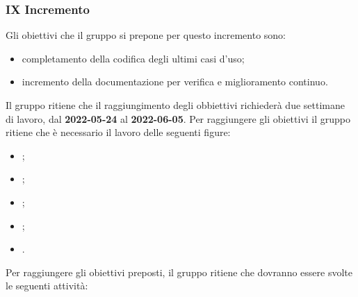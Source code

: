 \subsubsection{IX Incremento}
Gli obiettivi che il gruppo si prepone per questo incremento sono:
\begin{itemize}
	\item completamento della codifica degli ultimi casi d'uso;
  	\item incremento della documentazione per verifica e miglioramento continuo.
\end{itemize}
Il gruppo ritiene che il raggiungimento degli obbiettivi richiederà due settimane di lavoro, dal \textbf{2022-05-24} al \textbf{2022-06-05}.
Per raggiungere gli obiettivi il gruppo ritiene che è necessario il lavoro delle seguenti figure:
\begin{itemize}
	\item \RE{};
 	\item \AM{};
   	\item \PT{};
    \item \PR{};
   	\item \VE{}.
\end{itemize}
Per raggiungere gli obiettivi preposti, il gruppo ritiene che dovranno essere svolte le seguenti attività:
